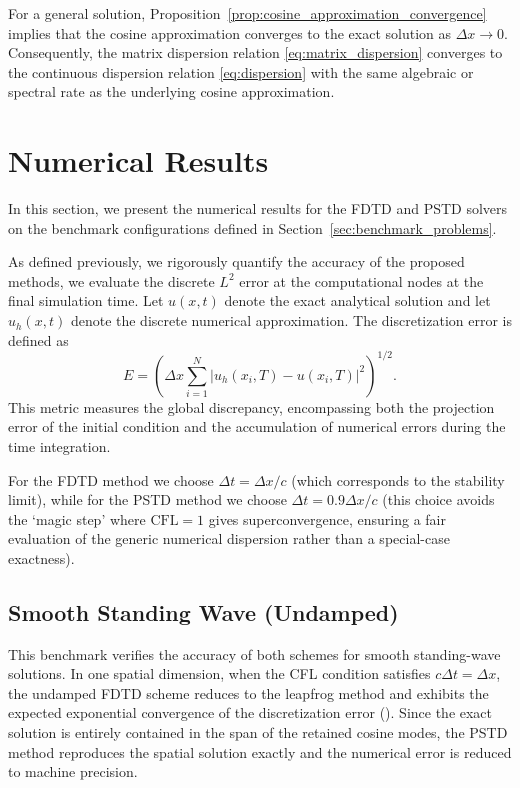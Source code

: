 \documentclass{Configuration_Files/PoliMi3i_thesis}
\begin{document}
For a general solution, Proposition~\ref{prop:cosine_approximation_convergence} implies that the cosine approximation converges to the exact solution as $\Delta x\to0$. Consequently, the matrix dispersion relation \eqref{eq:matrix_dispersion} converges to the continuous dispersion relation \eqref{eq:dispersion} with the same algebraic or spectral rate as the underlying cosine approximation.

\section{Numerical Results}
\label{sec:numerical_results}
In this section, we present the numerical results for the FDTD and PSTD solvers on the benchmark configurations defined in Section~\ref{sec:benchmark_problems}.

As defined previously, we rigorously quantify the accuracy of the proposed methods, we evaluate the discrete $L^2$ error at the computational nodes at the final simulation time. Let $u(x,t)$ denote the exact analytical solution and let $u_h(x,t)$ denote the discrete numerical approximation. The discretization error is defined as
\[
E
=
\left(
\Delta x
\sum_{i=1}^N
|u_h(x_i,T)-u(x_i,T)|^2
\right)^{1/2}.
\]
This metric measures the global discrepancy, encompassing both the projection error of the initial condition and the accumulation of numerical errors during the time integration.

For the FDTD method we choose $\Delta t = \Delta x/c$ (which corresponds to the stability limit), while for the PSTD method we choose $\Delta t = 0.9\Delta x/c$ (this choice avoids the `magic step' where $\text{CFL}=1$ gives superconvergence, ensuring a fair evaluation of the generic numerical dispersion rather than a special-case exactness).

\subsection{Smooth Standing Wave (Undamped)}
This benchmark verifies the accuracy of both schemes for smooth standing-wave solutions. In one spatial dimension, when the CFL condition satisfies $c\Delta t=\Delta x$, the undamped FDTD scheme reduces to the leapfrog method and exhibits the expected exponential convergence of the discretization error (\cite{bilbao_numerical_2009}). Since the exact solution is entirely contained in the span of the retained cosine modes, the PSTD method reproduces the spatial solution exactly and the numerical error is reduced to machine precision.
\end{document}
